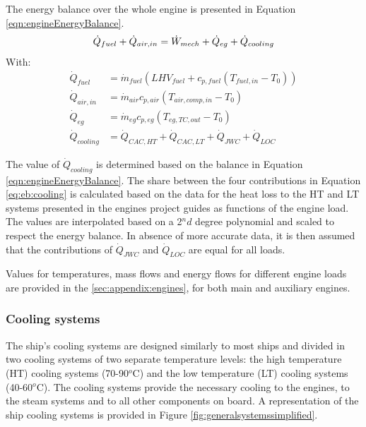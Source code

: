 \documentclass[preprint,12pt]{elsarticle}
\begin{document}
The energy balance over the whole engine is presented in Equation \ref{eqn:engineEnergyBalance}.
\begin{equation}
\dot{Q}_{fuel} + \dot{Q}_{air,in} = \dot{W}_{mech} + \dot{Q}_{eg} + \dot{Q}_{cooling}  \label{eqn:engineEnergyBalance} \\
\end{equation}
With: 
\begin{align}
\dot{Q}_{fuel} & =\dot{m}_{fuel} (LHV_{fuel} + c_{p,fuel} (T_{fuel,in} - T_0))\\
\dot{Q}_{air,in} & = \dot{m}_{air} c_{p,air} (T_{air,comp,in} - T_0) \\ 
\dot{Q}_{eg} & = \dot{m}_{eg} c_{p,eg} (T_{eg,TC,out} - T_0) \\
\dot{Q}_{cooling} & = \dot{Q}_{CAC,HT} + \dot{Q}_{CAC,LT} + \dot{Q}_{JWC} + \dot{Q}_{LOC} \label{eq:eb:cooling}
\end{align}

The value of $\dot{Q}_{cooling}$ is determined based on the balance in Equation \ref{eqn:engineEnergyBalance}. The share between the four contributions in Equation \ref{eq:eb:cooling} is calculated based on the data for the heat loss to the HT and LT systems presented in the engines project guides as functions of the engine load. The values are interpolated based on a 2$^nd$ degree polynomial and scaled to respect the energy balance. In absence of more accurate data, it is then assumed that the contributions of $\dot{Q}_{JWC}$ and $\dot{Q}_{LOC}$ are equal for all loads. 

Values for temperatures, mass flows and energy flows for different engine loads are provided in the \ref{sec:appendix:engines}, for both main and auxiliary engines.







\subsubsection{Cooling systems}

The ship's cooling systems are designed similarly to most ships and divided in two cooling systems of two separate temperature levels: the high temperature (HT) cooling systems (70-90$^o$C) and the low temperature (LT) cooling systems (40-60$^o$C). The cooling systems provide the necessary cooling to the engines, to the steam systems and to all other components on board. A representation of the ship cooling systems is provided in Figure \ref{fig:generalsystemssimplified}. 
\end{document}
